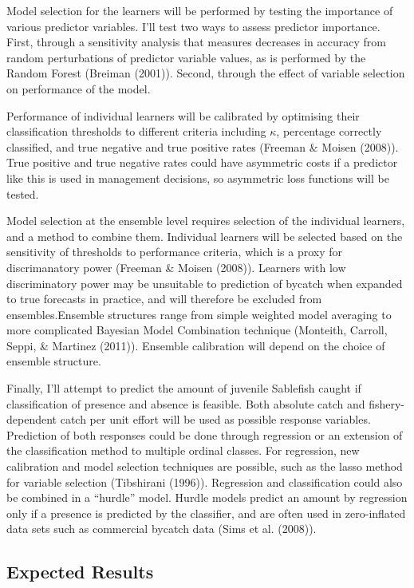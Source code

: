 \documentclass[12pt,]{scrartcl}
\begin{document}
Model selection for the learners will be performed by testing the
importance of various predictor variables. I'll test two ways to assess
predictor importance. First, through a sensitivity analysis that
measures decreases in accuracy from random perturbations of predictor
variable values, as is performed by the Random Forest (Breiman (2001)).
Second, through the effect of variable selection on performance of the
model.

Performance of individual learners will be calibrated by optimising
their classification thresholds to different criteria including
\(\kappa\), percentage correctly classified, and true negative and true
positive rates (Freeman \& Moisen (2008)). True positive and true
negative rates could have asymmetric costs if a predictor like this is
used in management decisions, so asymmetric loss functions will be
tested.

Model selection at the ensemble level requires selection of the
individual learners, and a method to combine them. Individual learners
will be selected based on the sensitivity of thresholds to performance
criteria, which is a proxy for discrimanatory power (Freeman \& Moisen
(2008)). Learners with low discriminatory power may be unsuitable to
prediction of bycatch when expanded to true forecasts in practice, and
will therefore be excluded from ensembles.Ensemble structures range from
simple weighted model averaging to more complicated Bayesian Model
Combination technique (Monteith, Carroll, Seppi, \& Martinez (2011)).
Ensemble calibration will depend on the choice of ensemble structure.

Finally, I'll attempt to predict the amount of juvenile Sablefish caught
if classification of presence and absence is feasible. Both absolute
catch and fishery-dependent catch per unit effort will be used as
possible response variables. Prediction of both responses could be done
through regression or an extension of the classification method to
multiple ordinal classes. For regression, new calibration and model
selection techniques are possible, such as the lasso method for variable
selection (Tibshirani (1996)). Regression and classification could also
be combined in a ``hurdle'' model. Hurdle models predict an amount by
regression only if a presence is predicted by the classifier, and are
often used in zero-inflated data sets such as commercial bycatch data
(Sims et al. (2008)).

\subsection{Expected Results}\label{expected-results-3}
\end{document}
